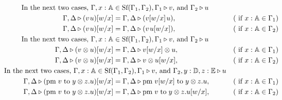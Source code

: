 \begin{definition}
\begin{align*}
  \hspace{-23pt}\text{In the next two cases, }\Gamma,x: \mathbb{A} & \in \text{Sf}(\Gamma_1,\Gamma_2), \Gamma_1 \triangleright v \text{, and } \Gamma_2 \triangleright u  \\
  \hspace{-23pt}\Gamma, \Delta  \triangleright (v \hspace{1pt}  u)[w/x] &= \Gamma, \Delta  \triangleright (v[w/x] \hspace{1pt} u), & (\text{ if } x: \mathbb{A} \in \Gamma_1)\\
  \hspace{-23pt}\Gamma, \Delta  \triangleright (v \hspace{1pt}  u)[w/x] &= \Gamma, \Delta  \triangleright (v \hspace{1pt} u[w/x]), & (\text{ if } x: \mathbb{A} \in \Gamma_2)\\
  \hspace{-23pt}\text{In the next two cases, }\Gamma,x: \mathbb{A} & \in \text{Sf}(\Gamma_1,\Gamma_2), \Gamma_1 \triangleright v \text{, and } \Gamma_2 \triangleright u  \\
  \hspace{-23pt}\Gamma, \Delta  \triangleright (v \otimes u)[w/x] &= \Gamma, \Delta  \triangleright v[w/x] \otimes u, & (\text{ if } x: \mathbb{A} \in \Gamma_1)\\ 
  \hspace{-23pt}\Gamma, \Delta  \triangleright (v \otimes u)[w/x] &= \Gamma, \Delta  \triangleright v \otimes u[w/x], & (\text{ if } x: \mathbb{A} \in \Gamma_2)\\
  \hspace{-23pt}\text{In the next two cases, }\Gamma,x: \mathbb{A}  \in \text{Sf}(&\Gamma_1,\Gamma_2), \Gamma_1 \triangleright v \text{, and } \Gamma_2, y: \mathbb{D}, z:\mathbb{E} \triangleright u  \\
  \hspace{-23pt} \Gamma, \Delta  \triangleright (\text{pm} \hspace{3 pt} v \hspace{3 pt} \text{to} \hspace{3 pt} y \otimes z. u)[w/x] &= \Gamma, \Delta  \triangleright \text{pm} \hspace{3 pt} v[w/x] \hspace{3 pt} \text{to} \hspace{3 pt} y \otimes z. u,  &  (\text{ if } x: \mathbb{A} \in \Gamma_1) \\
  \hspace{-23pt} \Gamma, \Delta  \triangleright (\text{pm} \hspace{3 pt} v \hspace{3 pt} \text{to} \hspace{3 pt} y \otimes z. u)[w/x] &= \Gamma, \Delta  \triangleright \text{pm} \hspace{3 pt} v \hspace{3 pt} \text{to} \hspace{3 pt} y \otimes z. u[w/x],  &  (\text{ if } x: \mathbb{A} \in \Gamma_2) \\

\end{align*}
\end{definition}
